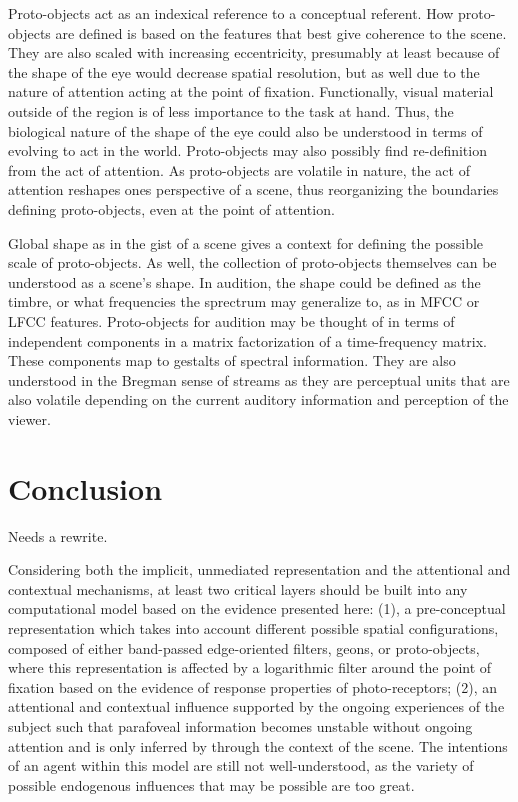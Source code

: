 \documentclass[a4paper,10pt,final]{ThesisStyle}
\begin{document}
Proto-objects act as an indexical reference to a conceptual referent.  How proto-objects are defined is based on the features that best give coherence to the scene.  They are also scaled with increasing eccentricity, presumably at least because of the shape of the eye would decrease spatial resolution, but as well due to the nature of attention acting at the point of fixation.  Functionally, visual material outside of the region is of less importance to the task at hand.  Thus, the biological nature of the shape of the eye could also be understood in terms of evolving to act in the world.  Proto-objects may also possibly find re-definition from the act of attention.  As proto-objects are volatile in nature, the act of attention reshapes ones perspective of a scene, thus reorganizing the boundaries defining proto-objects, even at the point of attention.

Global shape as in the gist of a scene gives a context for defining the possible scale of proto-objects.  As well, the collection of proto-objects themselves can be understood as a scene's shape.  In audition, the shape could be defined as the timbre, or what frequencies the sprectrum may generalize to, as in MFCC or LFCC features.  Proto-objects for audition may be thought of in terms of independent components in a matrix factorization of a time-frequency matrix.  These components map to gestalts of spectral information.  They are also understood in the Bregman sense of streams as they are perceptual units that are also volatile depending on the current auditory information and perception of the viewer.

\section{Conclusion}

Needs a rewrite.

Considering both the implicit, unmediated representation and the attentional and contextual mechanisms, at least two critical layers should be built into any computational model based on the evidence presented here:  (1), a pre-conceptual representation which takes into account different possible spatial configurations, composed of either band-passed edge-oriented filters, geons, or proto-objects, where this representation is affected by a logarithmic filter around the point of fixation based on the evidence of response properties of photo-receptors; (2), an attentional and contextual influence supported by the ongoing experiences of the subject such that parafoveal information becomes unstable without ongoing attention and is only inferred by through the context of the scene.  The intentions of an agent within this model are still not well-understood, as the variety of possible endogenous influences that may be possible are too great.  
\end{document}
